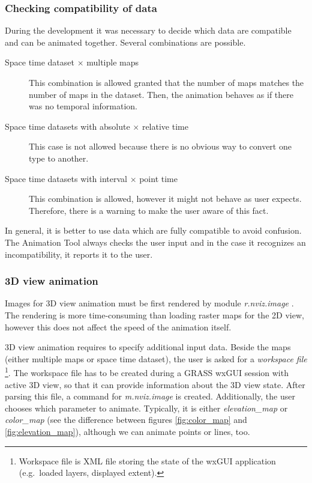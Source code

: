 \documentclass[a4paper,12pt]{book}
\newcommand{\mod}[1]{\textsl{#1}}
\newcommand{\at}{Animation Tool\xspace}
\begin{document}
\subsubsection{Checking compatibility of data}
During the development it was necessary to decide which data are compatible and can be animated together.
Several combinations are possible.
\begin{description}
  \item[Space time dataset $\times$ multiple maps]
  This combination is allowed granted that the number of maps matches the number of maps in the dataset.
  Then, the animation behaves as if there was no temporal information.

  \item[Space time datasets with absolute $\times$ relative time]
  This case is not allowed because there is no obvious way to convert one type to another.

  \item[Space time datasets with interval $\times$ point time]
  This combination is allowed, however it might not behave as user expects.
  Therefore, there is a warning to make the user aware of this fact.
 \end{description}
 
In general, it is better to use data which are fully compatible to avoid confusion.
The \at always checks the user input and in the case it recognizes an incompatibility, it reports it to the user.


\subsubsection{3D view animation}
\label{sec:3dViewAnimation}
Images for 3D view animation must be first rendered by module \mod{r.nviz.image} \cite{grassUserMan}.
The rendering is more time-consuming than loading raster maps for the 2D view,
however this does not affect the speed of the animation itself.

3D view animation requires to specify additional input data.
Beside the maps (either multiple maps or space time dataset), the user is asked for a \emph{workspace file}%
\footnote{Workspace file is XML file storing the state of the wxGUI application (e.g.\ loaded layers, displayed extent).}.
The workspace file has to be created during a GRASS wxGUI session with active 3D view,
so that it can provide information about the 3D view state. After parsing this file, a command for \mod{m.nviz.image}
is created.
Additionally, the user chooses which parameter to animate.
Typically, it is either \emph{elevation\_map} or \emph{color\_map}
(see the difference between figures \ref{fig:color_map} and \ref{fig:elevation_map}),
although we can animate points or lines, too.
\end{document}
